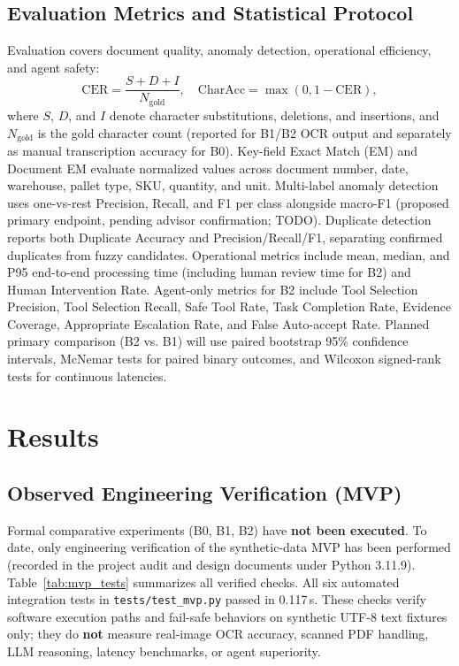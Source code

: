 \documentclass[conference]{IEEEtran}
\begin{document}
\subsection{Evaluation Metrics and Statistical Protocol}
Evaluation covers document quality, anomaly detection, operational efficiency, and agent safety:
\begin{equation}
\mathrm{CER} = \frac{S + D + I}{N_{\mathrm{gold}}}, \quad \mathrm{CharAcc} = \max(0, 1 - \mathrm{CER}),
\end{equation}
where $S$, $D$, and $I$ denote character substitutions, deletions, and insertions, and $N_{\mathrm{gold}}$ is the gold character count (reported for B1/B2 OCR output and separately as manual transcription accuracy for B0). Key-field Exact Match (EM) and Document EM evaluate normalized values across document number, date, warehouse, pallet type, SKU, quantity, and unit. Multi-label anomaly detection uses one-vs-rest Precision, Recall, and F1 per class alongside macro-F1 (proposed primary endpoint, pending advisor confirmation; TODO). Duplicate detection reports both Duplicate Accuracy and Precision/Recall/F1, separating confirmed duplicates from fuzzy candidates. Operational metrics include mean, median, and P95 end-to-end processing time (including human review time for B2) and Human Intervention Rate. Agent-only metrics for B2 include Tool Selection Precision, Tool Selection Recall, Safe Tool Rate, Task Completion Rate, Evidence Coverage, Appropriate Escalation Rate, and False Auto-accept Rate. Planned primary comparison (B2 vs. B1) will use paired bootstrap 95\% confidence intervals, McNemar tests for paired binary outcomes, and Wilcoxon signed-rank tests for continuous latencies.

\section{Results}

\subsection{Observed Engineering Verification (MVP)}
Formal comparative experiments (B0, B1, B2) have \textbf{not been executed}. To date, only engineering verification of the synthetic-data MVP has been performed (recorded in the project audit and design documents under Python 3.11.9). Table~\ref{tab:mvp_tests} summarizes all verified checks. All six automated integration tests in \texttt{tests/\allowbreak test\_\allowbreak mvp.py} passed in 0.117\,s. These checks verify software execution paths and fail-safe behaviors on synthetic UTF-8 text fixtures only; they do \textbf{not} measure real-image OCR accuracy, scanned PDF handling, LLM reasoning, latency benchmarks, or agent superiority.
\end{document}
